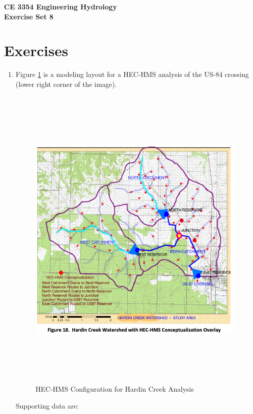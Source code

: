 \documentclass[12pt]{article}
\begin{document}
\begin{center}
{\textbf{{ CE 3354 Engineering Hydrology} \\ {Exercise Set 8}}}
\end{center}

\section*{\small{Exercises}}
\begin{enumerate}

\item Figure \ref{fig:HardinCreekLayout} is a modeling layout for a HEC-HMS analysis of the US-84 crossing (lower right corner of the image).

\begin{figure}[h!] %
   \centering
   \includegraphics[height=6in]{HardinCreekLayout.png} 
   \caption{HEC-HMS Configuration for Hardin Creek Analysis}
   \label{fig:HardinCreekLayout}
\end{figure}

\clearpage

Supporting data are:


\end{enumerate}
\end{document}
